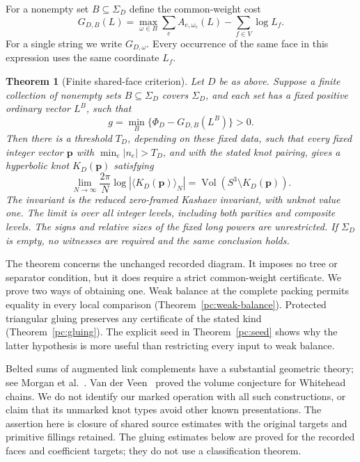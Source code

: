 \documentclass[11pt]{article}
\numberwithin{equation}{section}
\newtheorem{theorem}{Theorem}[section]
\theoremstyle{definition}\newtheorem{definition}[theorem]{Definition}
\theoremstyle{remark}\newtheorem{remark}[theorem]{Remark}
\newcommand{\Vol}{\operatorname{Vol}}
\begin{document}
For a nonempty set \(B\subseteq\Sigma_D\) define the common-weight cost
\begin{equation}\label{pc:branch-cost}
 G_{D,B}(L)=\max_{\omega\in B}\sum_e A_{e,\omega_e}(L)
                                  -\sum_{f\in V}\log L_f.
\end{equation}
For a single string we write \(G_{D,\omega}\).
Every occurrence of the same face in this expression uses the same
coordinate \(L_f\).

\begin{theorem}[Finite shared-face criterion]\label{pc:cover}
Let \(D\) be as above. Suppose a finite collection of nonempty sets
\(B\subseteq\Sigma_D\) covers \(\Sigma_D\), and each set has a fixed
positive ordinary vector \(L^B\), such that
\begin{equation}\label{pc:cover-gap}
 g=\min_B\{\Phi_D-G_{D,B}(L^B)\}>0.
\end{equation}
Then there is a threshold \(T_D\), depending on these fixed data,
such that every fixed integer vector \(\boldsymbol p\) with
\(\min_e|n_e|>T_D\), and with the stated knot pairing, gives a
hyperbolic knot \(K_D(\boldsymbol p)\) satisfying
\begin{equation}\label{pc:volume}
 \lim_{N\to\infty}\frac{2\pi}{N}
       \log|\langle K_D(\boldsymbol p)\rangle_N|
       =\Vol(S^3\setminus K_D(\boldsymbol p)).
\end{equation}
The invariant is the reduced zero-framed Kashaev invariant, with
unknot value one. The limit is over all integer levels, including
both parities and composite levels. The signs and relative sizes of
the fixed long powers are unrestricted. If \(\Sigma_D\) is empty,
no witnesses are required and the same conclusion holds.
\end{theorem}

The theorem concerns the unchanged recorded diagram. It imposes no
tree or separator condition, but it does require a strict common-weight
certificate. We prove two ways of obtaining one. Weak balance at the
complete packing permits equality in every local comparison
(Theorem~\ref{pc:weak-balance}). Protected triangular gluing preserves
any certificate of the stated kind (Theorem~\ref{pc:gluing}).
The explicit seed in Theorem~\ref{pc:seed} shows why the latter
hypothesis is more useful than restricting every input to weak balance.

Belted sums of augmented link complements have a substantial geometric
theory; see Morgan et al.~\cite{Belted}. Van der Veen~\cite{Whitehead}
proved the volume conjecture for Whitehead chains. We do not identify
our marked operation with all such constructions, or claim that its
unmarked knot types avoid other known presentations. The assertion here
is closure of shared source estimates with the original targets and
primitive fillings retained. The gluing estimates below are proved for the recorded faces and coefficient targets; they do not use a classification theorem.
\end{document}
